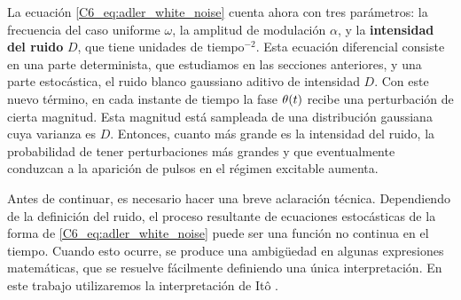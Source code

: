 \documentclass[./main.tex]{subfiles}
\begin{document}
La ecuación \ref{C6_eq:adler_white_noise} cuenta ahora con tres parámetros: la frecuencia del caso uniforme $\omega$, la amplitud de modulación $\alpha$, y la \textbf{intensidad del ruido} $D$, que tiene unidades de $\text{tiempo}^{-2}$. Esta ecuación diferencial consiste en una parte determinista, que estudiamos en las secciones anteriores, y una parte estocástica, el ruido blanco gaussiano aditivo de intensidad $D$. Con este nuevo término, en cada instante de tiempo la fase $\theta(t)$ recibe una perturbación de cierta magnitud. Esta magnitud está sampleada de una distribución gaussiana cuya varianza es $D$. Entonces, cuanto más grande es la intensidad del ruido, la probabilidad de tener perturbaciones más grandes y que eventualmente conduzcan a la aparición de pulsos en el régimen excitable aumenta.  


Antes de continuar, es necesario hacer una breve aclaración técnica. Dependiendo de la definición del ruido, el proceso resultante de ecuaciones estocásticas de la forma de \ref{C6_eq:adler_white_noise} puede ser una función no continua en el tiempo. Cuando esto ocurre, se produce una ambigüedad en algunas expresiones matemáticas, que se resuelve fácilmente definiendo una única interpretación. En este trabajo utilizaremos la interpretación de Itô \cite{SanMiguel2000}. 
\end{document}

